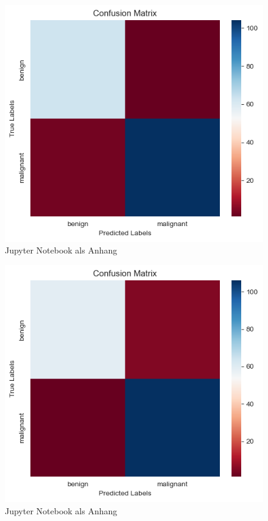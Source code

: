 \documentclass[a4paper,12pt]{article}
\begin{document}
\begin{figure}[H]
    \centering
    \includegraphics[width=\textwidth]{confsvmlinear.png}
    \caption{Jupyter Notebook als Anhang}
    \label{fig:confsvmlinear}
\end{figure}
\begin{figure}[H]
    \centering
    \includegraphics[width=\textwidth]{confsvmpoly.png}
    \caption{Jupyter Notebook als Anhang}
    \label{fig:confsvmpoly}
\end{figure}
\end{document}
